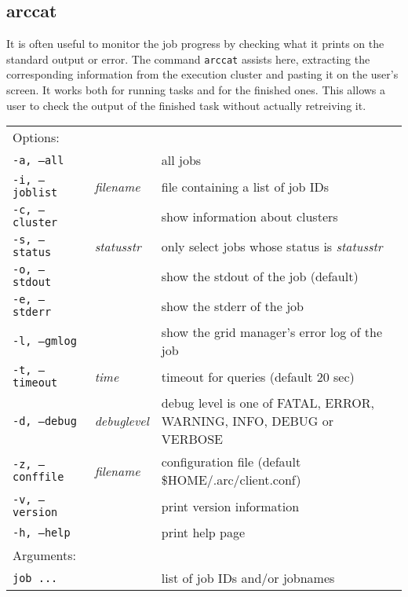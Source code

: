 \subsection{arccat}
\label{sec:arccat}

It is often useful to monitor the job progress by checking what it
prints on the standard output or error. The command \texttt{arccat}
 assists here, extracting the
corresponding information from the execution cluster and pasting it
on the user's screen. It works both for running tasks and for the
finished ones. This allows a user to check the output of the
finished task without actually retreiving it.

\hspace*{0.5cm}
\begin{shaded}
\end{shaded}
\begin{longtable}{llp{8cm}}
   Options:&&\\
   \texttt{-a, --all}& & all jobs\\
   \texttt{-i, --joblist}& \textit{filename} & file containing a list of job IDs\\
   \texttt{-c, --cluster}& & show information about clusters\\
   \texttt{-s, --status}& \textit{statusstr} &only select jobs whose status is \textit{statusstr}\\
   \texttt{-o, --stdout}& & show the stdout of the job (default)\\
   \texttt{-e, --stderr}& & show the stderr of the job\\
   \texttt{-l, --gmlog}& & show the grid manager's error log of the job\\
   \texttt{-t, --timeout}& \textit{time} & timeout for queries (default 20 sec)\\
   \texttt{-d, --debug}& \textit{debuglevel}&debug level is one of  FATAL, ERROR, WARNING, INFO, DEBUG or VERBOSE\\
   \texttt{-z, --conffile}&\textit{filename}& configuration file (default {\$}HOME/.arc/client.conf)\\
   \texttt{-v, --version}& & print version information\\
   \texttt{-h, --help}& & print help page\\
   Arguments:&&\\
   \texttt{job ...} && list of job IDs and/or jobnames\\
\end{longtable}

